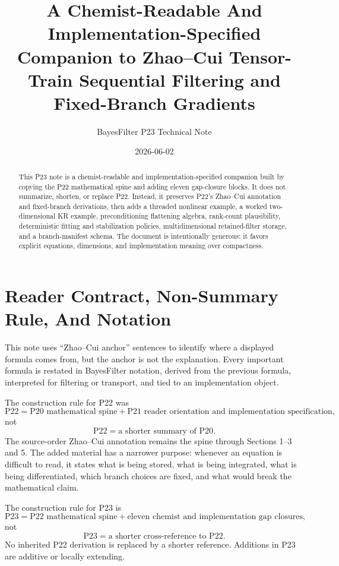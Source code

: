 \documentclass[11pt]{article}
\title{A Chemist-Readable And Implementation-Specified Companion to Zhao--Cui Tensor-Train Sequential Filtering and Fixed-Branch Gradients}
\author{BayesFilter P23 Technical Note}
\date{2026-06-02}
\begin{document}
\maketitle

\begin{abstract}
This P23 note is a chemist-readable and implementation-specified companion
built by copying the P22 mathematical spine and adding eleven gap-closure
blocks.  It does not summarize, shorten, or replace P22.  Instead, it
preserves P22's Zhao--Cui annotation and fixed-branch derivations, then adds a
threaded nonlinear example, a worked two-dimensional KR example,
preconditioning flattening algebra, rank-count plausibility, deterministic
fitting and stabilization policies, multidimensional retained-filter storage,
and a branch-manifest schema.  The document is intentionally generous: it
favors explicit equations, dimensions, and implementation meaning over
compactness.
\end{abstract}

\tableofcontents

\section{Reader Contract, Non-Summary Rule, And Notation}

This note uses ``Zhao--Cui anchor'' sentences to identify where a displayed
formula comes from, but the anchor is not the explanation.  Every important
formula is restated in BayesFilter notation, derived from the previous
formula, interpreted for filtering or transport, and tied to an implementation
object.

The construction rule for P22 was
\[
    \text{P22}
    =
    \text{P20 mathematical spine}
    +
    \text{P21 reader orientation and implementation specification},
    \tag{P22-C1}
\]
not
\[
    \text{P22}
    =
    \text{a shorter summary of P20}.
    \tag{P22-C2}
\]
The source-order Zhao--Cui annotation remains the spine through Sections
1--3 and 5.  The added material has a narrower purpose: whenever an equation
is difficult to read, it states what is being stored, what is being integrated,
what is being differentiated, which branch choices are fixed, and what would
break the mathematical claim.

The construction rule for P23 is
\[
    \text{P23}
    =
    \text{P22 mathematical spine}
    +
    \text{eleven chemist and implementation gap closures},
    \tag{P23-C1}
\]
not
\[
    \text{P23}
    =
    \text{a shorter cross-reference to P22}.
    \tag{P23-C2}
\]
No inherited P22 derivation is replaced by a shorter reference.  Additions in
P23 are additive or locally extending.
\end{document}
